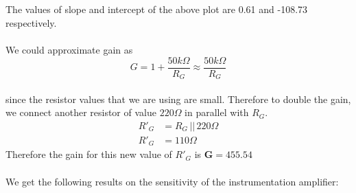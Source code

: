 \documentclass[12pt]{article}
\begin{document}
        \noindent
        \\\\
        The values of slope and intercept of the above plot are 0.61 and -108.73 respectively.
        \\\\
        We could approximate gain as
        \\
        \begin{equation}
            G = 1 + \frac{50k\Omega}{R_G} \approx \frac{50k\Omega}{R_G}    
        \end{equation}
        \\
        \noindent
        since the resistor values that we are using are small. Therefore to double the gain, we connect another resistor of value $220\Omega$ in parallel with $R_G$.
        \begin{align*}
            R'_G & = R_G \, || \, 220\Omega\\
            R'_G & = 110\Omega 
        \end{align*}
        \noindent
        Therefore the gain for this new value of $R'_G$ is $\mathbf{G = 455.54}$ 
        \\\\
        \newpage
        \noindent
        We get the following results on the sensitivity of the instrumentation amplifier:
        
\end{document}
